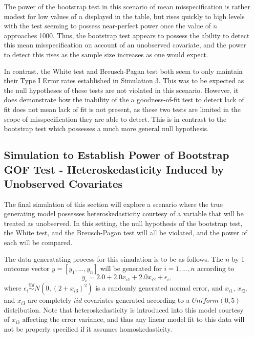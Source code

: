 		The power of the bootstrap test in this scenario of mean misspecification is rather modest for low values of $n$ displayed in the table, but rises quickly to high levels
		with the test seeming to possess near-perfect power once the value of $n$ approaches 1000. Thus, the bootstrap test appears to possess the ability to detect this mean
		misspecification on account of an unobserved covariate, and the power to detect this rises as the sample size increases as one would expect.

		In contrast, the White test and Breusch-Pagan test both seem to only maintain their Type I Error rates established in Simulation 3. This was to be expected
		as the null hypotheses of these tests are not violated in this scenario. However, it does demonstrate how the inability of the a goodness-of-fit test to detect lack of
		fit does not mean lack of fit is not present, as these two tests are limited in the scope of misspecification they are able to detect. This is in contrast to the
		bootstrap test which possesses a much more general null hypothesis.

		\subsection{Simulation to Establish Power of Bootstrap GOF Test - Heteroskedasticity Induced by Unobserved Covariates}

		The final simulation of this section will explore a scenario where the true generating model possesses heteroskedasticity courtesy of a variable that will be
		treated as unobserved. In this setting, the null hypothesis of the bootstrap test, the White test, and the Breusch-Pagan test will all be violated, and the
		power of each will be compared.

		The data generatating process for this simulation is to be as follows. The $n$ by 1 outcome vector $y = [y_1,...,y_n]$ will be generated for $i = 1,...,n$ according
		to
		\begin{equation}
			y_i = 2.0 + 2.0 x_{i1} + 2.0 x_{i2} + \epsilon_i , 
		\end{equation}
		where $\epsilon_i \stackrel{iid}{\sim} N \left( 0,(2 + x_{i3})^2 \right)$ is a randomly generated normal error, and $x_{i1}$, $x_{i2}$, and $x_{i3}$ are completely $iid$ covariates
		generated according to a $Uniform(0,5)$ distribution. Note that heteroskedasticity is introduced into this model courtesy of $x_{i3}$ affecting the error variance, and thus any
		linear model fit to this data will not be properly specified if it assumes homoskedasticity.
		

